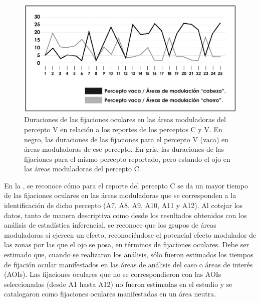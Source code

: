 \documentclass[spanish]{textolivre}
\begin{document}
\begin{figure}
\centering
\begin{minipage}{.75\textwidth}
    \includegraphics[width=\linewidth]{Fig7.jpeg}
    \caption{Duraciones de las fijaciones oculares en las áreas moduladoras del percepto V en relación a los reportes de los perceptos C y V. En negro, las duraciones de las fijaciones para el percepto V (vaca) en áreas moduladoras de ese percepto. En gris, las duraciones de las fijaciones para el mismo percepto reportado, pero estando el ojo en las áreas moduladoras del percepto C.}
    \label{fig7}
\end{minipage}
\end{figure}

En la , se reconoce cómo para el reporte del percepto C se da un mayor tiempo de las fijaciones oculares en las áreas moduladoras que se corresponden a la identificación de dicho percepto (A7, A8, A9, A10, A11 y A12). Al cotejar los datos, tanto de manera descriptiva como desde los resultados obtenidos con los análisis de estadística inferencial, se reconoce que los grupos de áreas moduladoras sí ejercen un efecto, reconociéndose el potencial efecto modulador de las zonas por las que el ojo se posa, en términos de fijaciones oculares. Debe ser estimado que, cuando se realizaron los análisis, sólo fueron estimados los tiempos de fijación ocular manifestados en las áreas de análisis del caso o áreas de interés (AOIs). Las fijaciones oculares que no se correspondieron con las AOIs seleccionadas (desde A1 hasta A12) no fueron estimadas en el estudio y se catalogaron como fijaciones oculares manifestadas en un área neutra.
\end{document}

